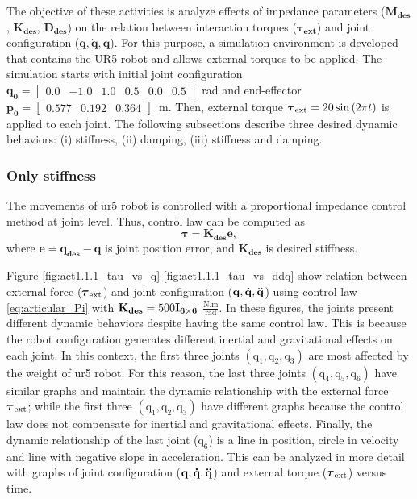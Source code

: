 \graphicspath{{images/act_1.1.1/}}
The objective of these activities is analyze effects of impedance parameters ($\mathbf{M_{des}}$, $\mathbf{K_{des}}$, $\mathbf{D_{des}}$) on the relation between interaction torques ($\boldsymbol{\tau}_\mathbf{ext}$) and joint configuration ($\mathbf{q, \dot{q}, \ddot{q}}$). For this purpose, a simulation environment is developed that contains the UR5 robot and allows external torques to be applied. The simulation starts with initial joint configuration $\mathbf{q_0}=\begin{bmatrix} 0.0 & -1.0 & 1.0 & 0.5 & 0.0 & 0.5 \end{bmatrix}$ rad and end-effector $\mathbf{p_0}=\begin{bmatrix}  0.577 &   0.192 &   0.364 \end{bmatrix}$~m. Then, external torque $\boldsymbol{\tau}_\mathrm{ext}= 20\sin{(2\pi t)}$ is applied to each joint. The following subsections describe three desired dynamic behaviors: (i) stiffness, (ii) damping, (iii) stiffness and damping.


\subsubsection{Only stiffness}
The movements of ur5 robot is controlled with a proportional impedance control method at joint level. Thus, control law can be computed as 
\begin{equation}
	\boldsymbol{\tau}
	= \mathbf{K_{des} e},
	\label{eq:articular_Pi}
\end{equation}
\noindent where $\mathbf{e}=\mathbf{q_{des} - q}$ is joint position error, and $\mathbf{K_{des}}$ is desired stiffness. 

Figure \ref{fig:act1.1.1_tau_vs_q}-\ref{fig:act1.1.1_tau_vs_ddq} show relation between external force ($\boldsymbol{\tau}_\mathrm{ext}$) and joint configuration ($\mathbf{q, \dot{q}, \ddot{q}}$) using control law \eqref{eq:articular_Pi} with $\mathbf{K_{des}}=500\mathbf{I_{6 \times 6}}$ $\mathrm{\frac{N.m}{rad}}$. In these figures, the joints present different dynamic behaviors despite having the same control law. This is because the robot configuration generates different inertial and gravitational effects on each joint. In this context, the first three joints $(\mathrm{q_1, q_2, q_3})$ are most affected by the weight of ur5 robot. For this reason, the last three joints $(\mathrm{q_4, q_5, q_6})$ have similar graphs and maintain the dynamic relationship with the external force $\boldsymbol{\tau}_\mathrm{ext}$; while the first three $(\mathrm{q_1, q_2, q_3})$ have different graphs because the control law does not compensate for inertial and gravitational effects. Finally, the dynamic relationship of the last joint ($\mathrm{q_6}$) is a line in position, circle in velocity and line with negative slope in acceleration. This can be analyzed in more detail with graphs of joint configuration ($\mathbf{q, \dot{q}, \ddot{q}}$) and external torque ($\boldsymbol{\tau}_\mathrm{ext}$) versus time. 

